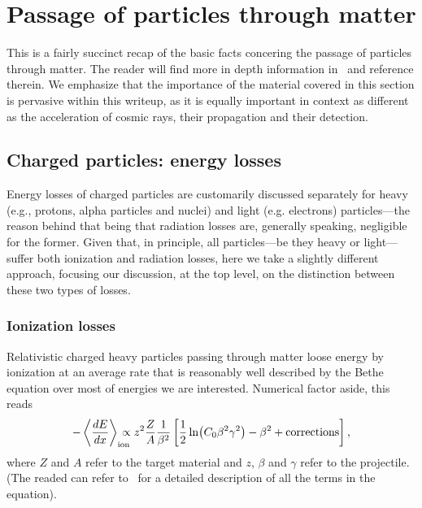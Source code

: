 \chapter{Passage of particles through matter}

This is a fairly succinct recap of the basic facts concering the passage of
particles through matter. The reader will find more in depth information
in~\cite{PDG} and reference therein. We emphasize that the importance of the
material covered in this section is pervasive within this writeup, as it is
equally important in context as different as the acceleration of cosmic rays,
their propagation and their detection.


\section{Charged particles: energy losses}

Energy losses of charged particles are customarily discussed separately for
heavy (e.g., protons, alpha particles and nuclei) and light
(e.g. electrons) particles---the reason behind that being that radiation losses
are, generally speaking, negligible for the former. Given that, in principle, all
particles---be they heavy or light---suffer both ionization and radiation
losses, here we take a slightly different approach, focusing our discussion,
at the top level, on the distinction between these two types of losses.


\subsection{Ionization losses}

Relativistic charged heavy particles passing through matter loose energy by
ionization at an average rate that is reasonably well described by the Bethe
equation over most of energies we are interested. Numerical factor aside, this
reads
\begin{align}\label{eq:stopping_power}
  -\left<\frac{dE}{dx}\right>_\text{ion} \!\!\!\!\!\!
  \propto z^2 \frac{Z}{A}\frac{1}{\beta^2}
  \left[ \frac{1}{2} \ln(C_0 \beta^2\gamma^2) - \beta^2 +
    \text{corrections} \right],
\end{align}
where $Z$ and $A$ refer to the target material and $z$, $\beta$ and $\gamma$
refer to the projectile. (The readed can refer to~\cite{PDG} for a detailed
description of all the terms in the equation).

